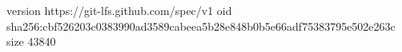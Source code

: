 version https://git-lfs.github.com/spec/v1
oid sha256:cbf526203c0383990ad3589cabeea5b28e848b0b5e66adf75383795e502e263c
size 43840
